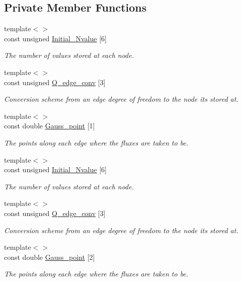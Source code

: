 \subsection*{Private Member Functions}
\begin{DoxyCompactItemize}
\item 
{\footnotesize template$<$$>$ }\\const unsigned \hyperlink{classoomph_1_1TPoroelasticityElement_acc13c4552465946c609e1e0e00aa5d5d}{Initial\+\_\+\+Nvalue} \mbox{[}6\mbox{]}
\begin{DoxyCompactList}\small\item\em The number of values stored at each node. \end{DoxyCompactList}\item 
{\footnotesize template$<$$>$ }\\const unsigned \hyperlink{classoomph_1_1TPoroelasticityElement_ae1f1a50ca99931bd44d2b4d02b525ca3}{Q\+\_\+edge\+\_\+conv} \mbox{[}3\mbox{]}
\begin{DoxyCompactList}\small\item\em Conversion scheme from an edge degree of freedom to the node it\textquotesingle{}s stored at. \end{DoxyCompactList}\item 
{\footnotesize template$<$$>$ }\\const double \hyperlink{classoomph_1_1TPoroelasticityElement_aeab4df0b6061ae0f12ee8f43b46dd73c}{Gauss\+\_\+point} \mbox{[}1\mbox{]}
\begin{DoxyCompactList}\small\item\em The points along each edge where the fluxes are taken to be. \end{DoxyCompactList}\item 
{\footnotesize template$<$$>$ }\\const unsigned \hyperlink{classoomph_1_1TPoroelasticityElement_a02e257dac8b7d8a26c5d7646a4e19113}{Initial\+\_\+\+Nvalue} \mbox{[}6\mbox{]}
\begin{DoxyCompactList}\small\item\em The number of values stored at each node. \end{DoxyCompactList}\item 
{\footnotesize template$<$$>$ }\\const unsigned \hyperlink{classoomph_1_1TPoroelasticityElement_a0e5fa28382d50931180aa018bd78a8b5}{Q\+\_\+edge\+\_\+conv} \mbox{[}3\mbox{]}
\begin{DoxyCompactList}\small\item\em Conversion scheme from an edge degree of freedom to the node it\textquotesingle{}s stored at. \end{DoxyCompactList}\item 
{\footnotesize template$<$$>$ }\\const double \hyperlink{classoomph_1_1TPoroelasticityElement_a7bbf908a66c7629f1dc17dea60046da5}{Gauss\+\_\+point} \mbox{[}2\mbox{]}
\begin{DoxyCompactList}\small\item\em The points along each edge where the fluxes are taken to be. \end{DoxyCompactList}\end{DoxyCompactItemize}
